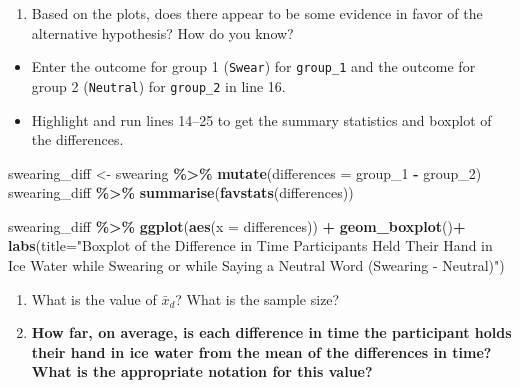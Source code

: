 \documentclass[
]{report}
\newenvironment{Shaded}{\begin{snugshade}}{\end{snugshade}}
\newcommand{\AttributeTok}[1]{\textcolor[rgb]{0.13,0.29,0.53}{#1}}
\newcommand{\FunctionTok}[1]{\textcolor[rgb]{0.13,0.29,0.53}{\textbf{#1}}}
\newcommand{\NormalTok}[1]{#1}
\newcommand{\OtherTok}[1]{\textcolor[rgb]{0.56,0.35,0.01}{#1}}
\newcommand{\SpecialCharTok}[1]{\textcolor[rgb]{0.81,0.36,0.00}{\textbf{#1}}}
\newcommand{\StringTok}[1]{\textcolor[rgb]{0.31,0.60,0.02}{#1}}
\providecommand{\tightlist}{%
  \setlength{\itemsep}{0pt}\setlength{\parskip}{0pt}}
\begin{document}
\begin{enumerate}
\def\labelenumi{\arabic{enumi}.}
\setcounter{enumi}{4}
\tightlist
\item
  Based on the plots, does there appear to be some evidence in favor of the alternative hypothesis? How do you know?
  \vspace{0.4in}
\end{enumerate}

\begin{itemize}
\item
  Enter the outcome for group 1 (\texttt{Swear}) for \texttt{group\_1} and the outcome for group 2 (\texttt{Neutral}) for \texttt{group\_2} in line 16.
\item
  Highlight and run lines 14--25 to get the summary statistics and boxplot of the differences.
\end{itemize}

\begin{Shaded}
\begin{Highlighting}[]
\NormalTok{swearing\_diff }\OtherTok{\textless{}{-}}\NormalTok{ swearing }\SpecialCharTok{\%\textgreater{}\%} 
  \FunctionTok{mutate}\NormalTok{(}\AttributeTok{differences =}\NormalTok{ group\_1 }\SpecialCharTok{{-}}\NormalTok{ group\_2)}
\NormalTok{swearing\_diff }\SpecialCharTok{\%\textgreater{}\%} 
    \FunctionTok{summarise}\NormalTok{(}\FunctionTok{favstats}\NormalTok{(differences))}

\NormalTok{swearing\_diff }\SpecialCharTok{\%\textgreater{}\%} 
    \FunctionTok{ggplot}\NormalTok{(}\FunctionTok{aes}\NormalTok{(}\AttributeTok{x =}\NormalTok{ differences)) }\SpecialCharTok{+}
    \FunctionTok{geom\_boxplot}\NormalTok{()}\SpecialCharTok{+}
    \FunctionTok{labs}\NormalTok{(}\AttributeTok{title=}\StringTok{"Boxplot of the Difference in Time Participants Held Their Hand }
\StringTok{         in Ice Water while Swearing or while Saying a Neutral Word (Swearing {-} Neutral)"}\NormalTok{)}
\end{Highlighting}
\end{Shaded}

\begin{enumerate}
\def\labelenumi{\arabic{enumi}.}
\setcounter{enumi}{5}
\item
  What is the value of \(\bar{x}_d\)? What is the sample size?
  \vspace{0.25in}
\item
  \textbf{How far, on average, is each difference in time the participant holds their hand in ice water from the mean of the differences in time? What is the appropriate notation for this value?}
\end{enumerate}
\end{document}
